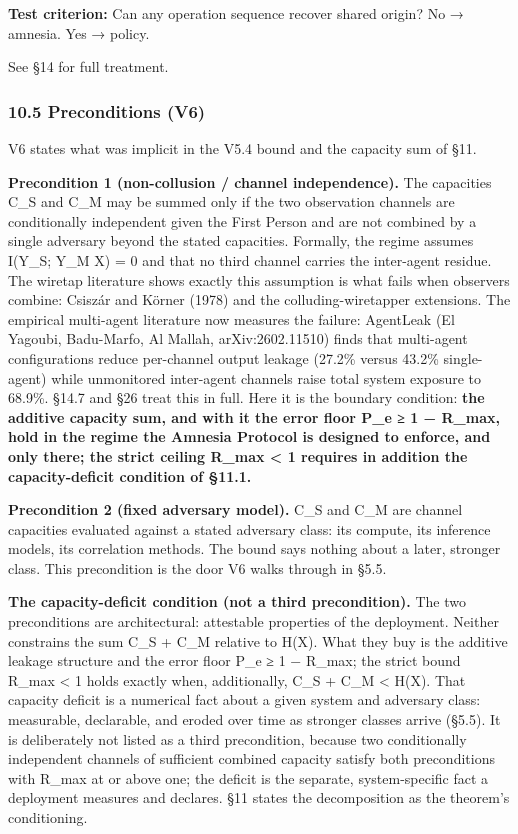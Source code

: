 \documentclass[
  11pt,
]{article}
\begin{document}
\textbf{Test criterion:} Can any operation sequence recover shared
origin? No → amnesia. Yes → policy.

See §14 for full treatment.

\subsubsection{10.5 Preconditions (V6)}\label{preconditions-v6}

V6 states what was implicit in the V5.4 bound and the capacity sum of
§11.

\textbf{Precondition 1 (non-collusion / channel independence).} The
capacities C\_S and C\_M may be summed only if the two observation
channels are conditionally independent given the First Person and are
not combined by a single adversary beyond the stated capacities.
Formally, the regime assumes I(Y\_S; Y\_M \textbar{} X) = 0 and that no
third channel carries the inter-agent residue. The wiretap literature
shows exactly this assumption is what fails when observers combine:
Csiszár and Körner (1978) and the colluding-wiretapper extensions. The
empirical multi-agent literature now measures the failure: AgentLeak (El
Yagoubi, Badu-Marfo, Al Mallah, arXiv:2602.11510) finds that multi-agent
configurations reduce per-channel output leakage (27.2\% versus 43.2\%
single-agent) while unmonitored inter-agent channels raise total system
exposure to 68.9\%. §14.7 and §26 treat this in full. Here it is the
boundary condition: \textbf{the additive capacity sum, and with it the
error floor P\_e ≥ 1 − R\_max, hold in the regime the Amnesia Protocol
is designed to enforce, and only there; the strict ceiling R\_max
\textless{} 1 requires in addition the capacity-deficit condition of
§11.1.}

\textbf{Precondition 2 (fixed adversary model).} C\_S and C\_M are
channel capacities evaluated against a stated adversary class: its
compute, its inference models, its correlation methods. The bound says
nothing about a later, stronger class. This precondition is the door V6
walks through in §5.5.

\textbf{The capacity-deficit condition (not a third precondition).} The
two preconditions are architectural: attestable properties of the
deployment. Neither constrains the sum C\_S + C\_M relative to H(X).
What they buy is the additive leakage structure and the error floor P\_e
≥ 1 − R\_max; the strict bound R\_max \textless{} 1 holds exactly when,
additionally, C\_S + C\_M \textless{} H(X). That capacity deficit is a
numerical fact about a given system and adversary class: measurable,
declarable, and eroded over time as stronger classes arrive (§5.5). It
is deliberately not listed as a third precondition, because two
conditionally independent channels of sufficient combined capacity
satisfy both preconditions with R\_max at or above one; the deficit is
the separate, system-specific fact a deployment measures and declares.
§11 states the decomposition as the theorem's conditioning.
\end{document}
